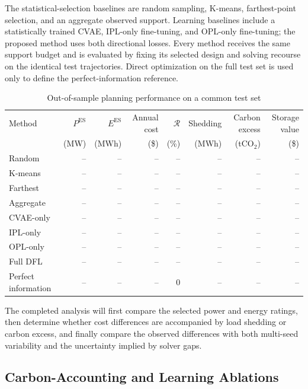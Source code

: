 \documentclass[times]{elsarticle}
\begin{document}
The statistical-selection baselines are random sampling, K-means,
farthest-point selection, and an aggregate observed support. Learning baselines
include a statistically trained CVAE, IPL-only fine-tuning, and OPL-only
fine-tuning; the proposed method uses both directional losses. Every method
receives the same support budget and is evaluated by fixing its selected design
and solving recourse on the identical test trajectories. Direct optimization on
the full test set is used only to define the perfect-information reference.

\begin{table}[t]
\centering
\caption{Out-of-sample planning performance on a common test set}
\label{tab:main_results}
\begin{tabular}{@{}lrrrrrrr@{}}
\toprule
Method & $P^{\mathrm{ES}}$ & $E^{\mathrm{ES}}$ & Annual cost & $\mathcal R$
& Shedding & Carbon excess & Storage value \\
& (MW) & (MWh) & (\$) & (\%) & (MWh) & (tCO$_2$) & (\$) \\
\midrule
Random & -- & -- & -- & -- & -- & -- & -- \\
K-means & -- & -- & -- & -- & -- & -- & -- \\
Farthest & -- & -- & -- & -- & -- & -- & -- \\
Aggregate & -- & -- & -- & -- & -- & -- & -- \\
CVAE-only & -- & -- & -- & -- & -- & -- & -- \\
IPL-only & -- & -- & -- & -- & -- & -- & -- \\
OPL-only & -- & -- & -- & -- & -- & -- & -- \\
Full DFL & -- & -- & -- & -- & -- & -- & -- \\
Perfect information & -- & -- & -- & 0 & -- & -- & -- \\
\bottomrule
\end{tabular}
\end{table}


The completed analysis will first compare the selected power and energy ratings,
then determine whether cost differences are accompanied by load shedding or
carbon excess, and finally compare the observed differences with both
multi-seed variability and the uncertainty implied by solver gaps.

\subsection{Carbon-Accounting and Learning Ablations}
\end{document}
